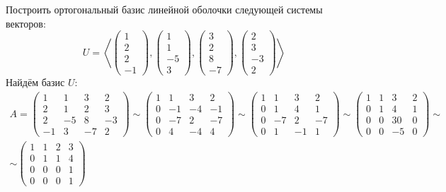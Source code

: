 Построить ортогональный базис линейной оболочки следующей системы векторов:
$$ U = \left\langle
\begin{pmatrix}
	1 \\
    2 \\
    2 \\
    -1
\end{pmatrix},
\begin{pmatrix}
	1 \\
    1 \\
    -5 \\
    3
\end{pmatrix},
\begin{pmatrix}
	3 \\
    2 \\
    8 \\
    -7
\end{pmatrix},
\begin{pmatrix}
	2 \\
    3 \\
    -3 \\
    2
\end{pmatrix} \right\rangle $$
Найдём базис $ U $:
\begin{multline*}
    A =
    \begin{pmatrix}
        1 & 1 & 3 & 2 \\
        2 & 1 & 2 & 3 \\
        2 & -5 & 8 & -3 \\
        -1 & 3 & -7 & 2
    \end{pmatrix} \sim
    \begin{pmatrix}
        1 & 1 & 3 & 2 \\
        0 & -1 & -4 & -1 \\
        0 & -7 & 2 & -7 \\
        0 & 4 & -4 & 4
    \end{pmatrix} \sim
    \begin{pmatrix}
        1 & 1 & 3 & 2 \\
        0 & 1 & 4 & 1 \\
        0 & -7 & 2 & -7 \\
        0 & 1 & -1 & 1
    \end{pmatrix} \sim
    \begin{pmatrix}
        1 & 1 & 3 & 2 \\
        0 & 1 & 4 & 1 \\
        0 & 0 & 30 & 0 \\
        0 & 0 & -5 & 0
    \end{pmatrix} \sim \\
    \sim
    \begin{pmatrix}
        1 & 1 & 2 & 3 \\
        0 & 1 & 1 & 4 \\
        0 & 0 & 0 & 1 \\
        0 & 0 & 0 & 1
    \end{pmatrix}
\end{multline*}
